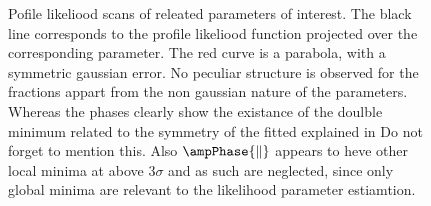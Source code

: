 \clearpage

\begin{figure}[h]
  \centering
  \begin{subfigure}{0.5\textwidth}
    \scalebox{0.60}{}
    \caption{}
    \label{skase}
  \end{subfigure}%
  \hfill%
  \begin{subfigure}{0.5\textwidth}
    \scalebox{0.60}{}
    \caption{}
    \label{opasd}
  \end{subfigure}
  \begin{subfigure}{0.5\textwidth}
    \scalebox{0.60}{}
    \caption{}
    \label{opa}
  \end{subfigure}%
  \hfill%
  \begin{subfigure}{0.5\textwidth}
    \scalebox{0.60}{}
    \caption{}
    \label{opa}
  \end{subfigure}
\caption{Pofile likeliood scans of \pwave releated parameters of interest. The black line corresponds to the profile likeliood
         function projected over the corresponding parameter. The red curve is a parabola, with a symmetric gaussian 
         error. No peculiar structure is observed for the \pwave fractions appart from the non gaussian nature of the parameters.
         Whereas the phases clearly show the existance of the doulble minimum related to the symmetry of the fitted \pdf 
         explained in  {\color{red} Do not forget to mention this}.
         Also $\ampPhase{\parallel}$ appears to heve other local minima at above $3\sigma$ and as such are neglected, since only
         global minima are relevant to the likelihood parameter estiamtion. }
\end{figure}

\clearpage

